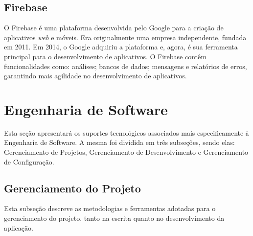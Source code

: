 \subsection{Firebase}

O Firebase \cite{firebase2011} é uma plataforma desenvolvida pelo Google para a criação de aplicativos 
\emph{web} e móveis. Era originalmente uma empresa independente, fundada em 2011. 
Em 2014, o Google adquiriu a plataforma e, agora, é sua ferramenta principal 
para o desenvolvimento de aplicativos. O Firebase contêm funcionalidades como: 
análises; bancos de dados; mensagens e relatórios de erros, garantindo mais agilidade no desenvolvimento de aplicativos.

\section{Engenharia de Software}

Esta seção apresentará os suportes tecnológicos associados mais especificamente 
à Engenharia de Software. A mesma foi dividida em três subseções, sendo elas: 
Gerenciamento de Projetos, Gerenciamento de Desenvolvimento e Gerenciamento de 
Configuração.

\subsection{Gerenciamento do Projeto}

Esta subseção descreve as metodologias e ferramentas adotadas para o gerenciamento 
do projeto, tanto na escrita quanto no desenvolvimento da aplicação.

